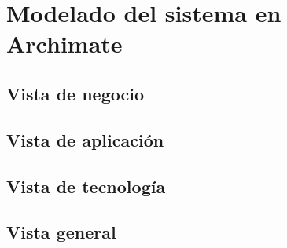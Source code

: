 \label{cap:disenio}

\section{Modelado del sistema en Archimate}


\subsection{Vista de negocio}


\subsection{Vista de aplicación}


\subsection{Vista de tecnología}



\subsection{Vista general}


